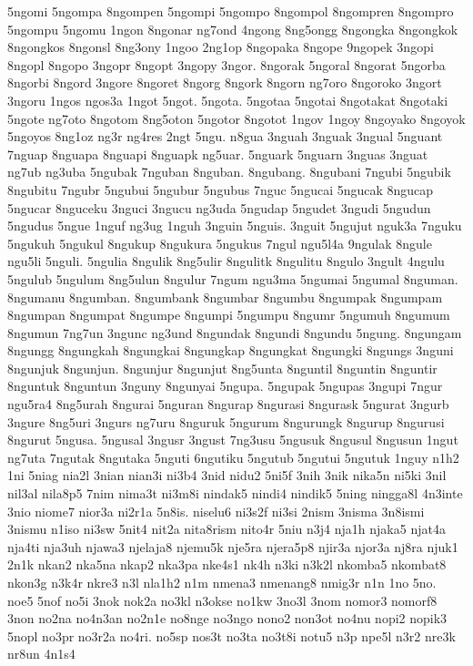{5ngomi 5ngompa 8ngompen 5ngompi 5ngompo 8ngompol 8ngompren 8ngompro
5ngompu 5ngomu 1ngon 8ngonar ng7ond 4ngong 8ng5ongg 8ngongka 8ngongkok
8ngongkos 8ngonsl 8ng3ony 1ngoo 2ng1op 8ngopaka 8ngope 9ngopek 3ngopi
8ngopl 8ngopo 3ngopr 8ngopt 3ngopy 3ngor. 8ngorak 5ngoral 8ngorat 5ngorba
8ngorbi 8ngord 3ngore 8ngoret 8ngorg 8ngork 8ngorn ng7oro 8ngoroko 3ngort
3ngoru 1ngos ngos3a 1ngot 5ngot. 5ngota. 5ngotaa 5ngotai 8ngotakat
8ngotaki 5ngote ng7oto 8ngotom 8ng5oton 5ngotor 8ngotot 1ngov 1ngoy
8ngoyako 8ngoyok 5ngoyos 8ng1oz ng3r ng4res 2ngt 5ngu. n8gua 3nguah 3nguak
3ngual 5nguant 7nguap 8nguapa 8nguapi 8nguapk ng5uar. 5nguark 5nguarn
3nguas 3nguat ng7ub ng3uba 5ngubak 7nguban 8nguban. 8ngubang. 8ngubani
7ngubi 5ngubik 8ngubitu 7ngubr 5ngubui 5ngubur 5ngubus 7nguc 5ngucai
5ngucak 8ngucap 5ngucar 8nguceku 3nguci 3ngucu ng3uda 5ngudap 5ngudet
3ngudi 5ngudun 5ngudus 5ngue 1nguf ng3ug 1nguh 3nguin 5nguis. 3nguit
5ngujut nguk3a 7nguku 5ngukuh 5ngukul 8ngukup 8ngukura 5ngukus 7ngul
ngu5l4a 9ngulak 8ngule ngu5li 5nguli. 5ngulia 8ngulik 8ng5ulir 8ngulitk
8ngulitu 8ngulo 3ngult 4ngulu 5ngulub 5ngulum 8ng5ulun 8ngulur 7ngum
ngu3ma 5ngumai 5ngumal 8nguman. 8ngumanu 8ngumban. 8ngumbank 8ngumbar
8ngumbu 8ngumpak 8ngumpam 8ngumpan 8ngumpat 8ngumpe 8ngumpi 5ngumpu 8ngumr
5ngumuh 8ngumum 8ngumun 7ng7un 3ngunc ng3und 8ngundak 8ngundi 8ngundu
5ngung. 8ngungam 8ngungg 8ngungkah 8ngungkai 8ngungkap 8ngungkat 8ngungki
8ngungs 3nguni 8ngunjuk 8ngunjun. 8ngunjur 8ngunjut 8ng5unta 8nguntil
8nguntin 8nguntir 8nguntuk 8nguntun 3nguny 8ngunyai 5ngupa. 5ngupak
5ngupas 3ngupi 7ngur ngu5ra4 8ng5urah 8ngurai 5nguran 8ngurap 8ngurasi
8ngurask 5ngurat 3ngurb 3ngure 8ng5uri 3ngurs ng7uru 8nguruk 5ngurum
8ngurungk 8ngurup 8ngurusi 8ngurut 5ngusa. 5ngusal 3ngusr 3ngust 7ng3usu
5ngusuk 8ngusul 8ngusun 1ngut ng7uta 7ngutak 8ngutaka 5nguti 6ngutiku
5ngutub 5ngutui 5ngutuk 1nguy n1h2 1ni 5niag nia2l 3nian nian3i ni3b4 3nid
nidu2 5ni5f 3nih 3nik nika5n ni5ki 3nil nil3al nila8p5 7nim nima3t ni3m8i
nindak5 nindi4 nindik5 5ning ningga8l 4n3inte 3nio niome7 nior3a ni2r1a
5n8is. niselu6 ni3s2f ni3si 2nism 3nisma 3n8ismi 3nismu n1iso ni3sw 5nit4
nit2a nita8rism nito4r 5niu n3j4 nja1h njaka5 njat4a nja4ti nja3uh njawa3
njelaja8 njemu5k nje5ra njera5p8 njir3a njor3a nj8ra njuk1 2n1k nkan2
nka5na nkap2 nka3pa nke4s1 nk4h n3ki n3k2l nkomba5 nkombat8 nkon3g n3k4r
nkre3 n3l nla1h2 n1m nmena3 nmenang8 nmig3r n1n 1no 5no. noe5 5nof no5i
3nok nok2a no3kl n3okse no1kw 3no3l 3nom nomor3 nomorf8 3non no2na no4n3an
no2n1e no8nge no3ngo nono2 non3ot no4nu nopi2 nopik3 5nopl no3pr no3r2a
no4ri. no5sp nos3t no3ta no3t8i notu5 n3p npe5l n3r2 nre3k nr8un 4n1s4
}
